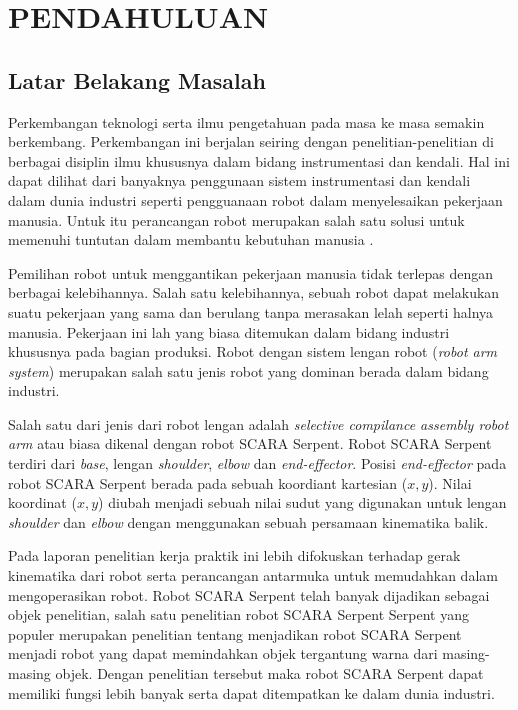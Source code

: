 
\chapter{PENDAHULUAN}

\section{Latar Belakang Masalah}

Perkembangan teknologi serta ilmu pengetahuan pada masa ke masa semakin berkembang. Perkembangan ini berjalan seiring dengan penelitian-penelitian di berbagai disiplin ilmu khususnya dalam bidang instrumentasi dan kendali. Hal ini dapat dilihat dari banyaknya penggunaan sistem instrumentasi dan kendali dalam dunia industri seperti pengguanaan robot dalam menyelesaikan pekerjaan manusia. Untuk itu perancangan robot merupakan salah satu solusi untuk memenuhi tuntutan dalam membantu kebutuhan manusia \cite{Faris2012}.

Pemilihan robot untuk menggantikan pekerjaan manusia tidak terlepas dengan berbagai kelebihannya. Salah satu kelebihannya, sebuah robot dapat melakukan suatu pekerjaan yang sama dan berulang tanpa merasakan lelah seperti halnya manusia. Pekerjaan ini lah yang biasa ditemukan dalam bidang industri khususnya pada bagian produksi. Robot dengan sistem lengan robot (\emph {robot arm system}) merupakan salah satu jenis robot yang dominan berada dalam bidang industri\cite{Bimantaka2014}. 

Salah satu dari jenis dari robot lengan adalah\textit{ selective compilance assembly robot arm} atau biasa dikenal dengan robot SCARA Serpent. Robot SCARA Serpent terdiri dari \textit{base}, lengan \textit{shoulder}, \textit{elbow} dan \textit{end-effector}. Posisi \textit{end-effector} pada robot SCARA Serpent berada pada sebuah koordiant kartesian ($x, y$). Nilai koordinat ($x, y$) diubah menjadi sebuah nilai sudut yang digunakan untuk lengan \textit{shoulder} dan \textit{elbow} dengan menggunakan sebuah persamaan kinematika balik.  

Pada laporan penelitian kerja praktik ini lebih difokuskan terhadap gerak kinematika dari robot serta perancangan antarmuka untuk memudahkan dalam mengoperasikan robot. Robot SCARA Serpent telah banyak dijadikan sebagai objek penelitian, salah satu penelitian robot SCARA Serpent Serpent yang populer merupakan penelitian tentang menjadikan robot SCARA Serpent menjadi robot yang dapat memindahkan objek tergantung warna dari masing-masing objek. Dengan penelitian tersebut maka robot SCARA Serpent dapat memiliki fungsi lebih banyak serta dapat ditempatkan ke dalam dunia industri.

